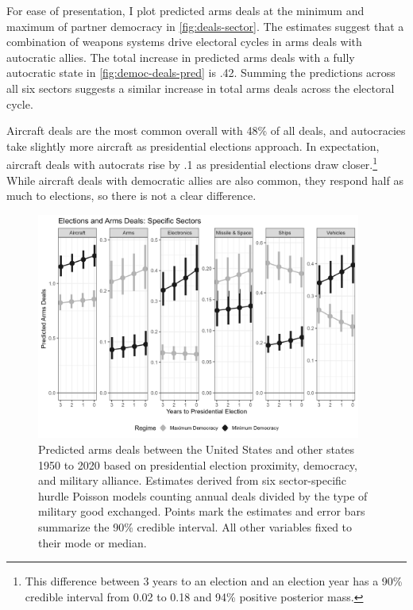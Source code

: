 \documentclass[12pt]{article}
\begin{document}
For ease of presentation, I plot predicted arms deals at the minimum and maximum of partner democracy in \autoref{fig:deals-sector}.
The estimates suggest that a combination of weapons systems drive electoral cycles in arms deals with autocratic allies.  
The total increase in predicted arms deals with a fully autocratic state in \autoref{fig:democ-deals-pred} is .42. 
Summing the predictions across all six sectors suggests a similar increase in total arms deals across the electoral cycle. 


Aircraft deals are the most common overall with 48\% of all deals, and autocracies take slightly more aircraft as presidential elections approach.
In expectation, aircraft deals with autocrats rise by .1 as presidential elections draw closer.\footnote{This difference between 3 years to an election and an election year has a 90\% credible interval from 0.02 to 0.18 and 94\% positive posterior mass.}
While aircraft deals with democratic allies are also common, they respond half as much to elections, so there is not a clear difference.  



\begin{figure}[htpb]
	\centering
		\includegraphics[width=0.95\textwidth]{../figures/deals-sector.png}
	\caption{Predicted arms deals between the United States and other states 1950 to 2020 based on presidential election proximity, democracy, and military alliance. Estimates derived from six sector-specific hurdle Poisson models counting annual deals divided by the type of military good exchanged. Points mark the estimates and error bars summarize the 90\% credible interval. All other variables fixed to their mode or median.}
	\label{fig:deals-sector}
\end{figure}
\end{document}
